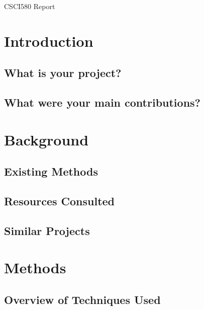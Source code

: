 \documentclass[12pt,twocolumn]{extarticle}
\begin{document}
CSCI580 Report
\section{Introduction}

\subsection{What is your project?}

\subsection{What were your main contributions?}

\section{Background}

\subsection{Existing Methods}

\subsection{Resources Consulted}

\subsection{Similar Projects}

\section{Methods}

\subsection{Overview of Techniques Used}
\end{document}
